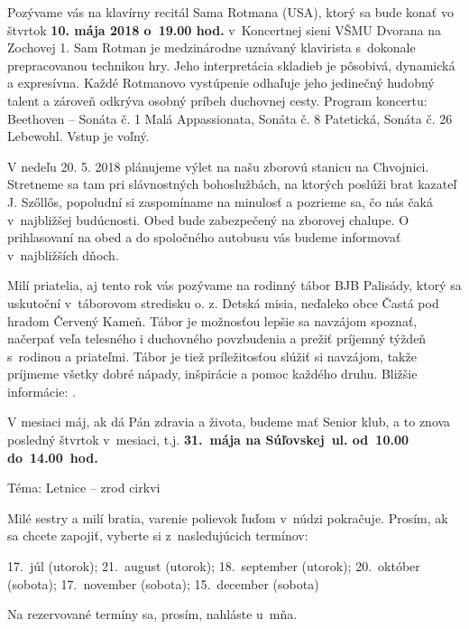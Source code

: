 

Pozývame vás na klavírny recitál Sama Rotmana (USA), ktorý sa bude konať vo štvrtok {\bf 10. mája 2018 o~19.00 hod.} v~Koncertnej sieni VŠMU Dvorana na Zochovej 1. Sam Rotman je medzinárodne uznávaný klavirista s~dokonale prepracovanou technikou hry. Jeho interpretácia skladieb je pôsobivá, dynamická a expresívna. Každé Rotmanovo vystúpenie odhaľuje jeho jedinečný hudobný talent a zároveň odkrýva osobný príbeh duchovnej cesty. Program koncertu: Beethoven – Sonáta č. 1 Malá Appassionata, Sonáta č. 8 Patetická, Sonáta č. 26 Lebewohl. Vstup je voľný.


V nedeľu 20. 5. 2018 plánujeme výlet na našu zborovú stanicu na Chvojnici. Stretneme sa tam pri slávnostných bohoslužbách, na ktorých poslúži brat kazateľ J. Szőllős, popoludní si zaspomíname na minulosť a pozrieme sa, čo nás čaká v~najbližšej budúcnosti. Obed bude zabezpečený na zborovej chalupe. O prihlasovaní na obed a do spoločného autobusu vás budeme informovať v~najbližších dňoch.


Milí priatelia, aj tento rok vás pozývame na rodinný tábor BJB Palisády, ktorý sa uskutoční v~táborovom stredisku o. z. Detská misia, neďaleko obce Častá pod hradom Červený Kameň. Tábor je možnosťou lepšie sa navzájom spoznať, načerpať veľa telesného i duchovného povzbudenia a prežiť príjemný týždeň s~rodinou a priateľmi. Tábor je tiež príležitosťou slúžiť si navzájom, takže príjmeme všetky dobré nápady, inšpirácie a pomoc každého druhu.
Bližšie informácie: .


V mesiaci máj, ak dá Pán zdravia a života, budeme mať Senior klub, a to znova posledný štvrtok v~mesiaci, t.j. {\bf 31.~mája na Súľovskej~ul. od~10.00 do~14.00~hod.}

Téma: Letnice -- zrod cirkvi



Milé sestry a milí bratia, varenie polievok ľuďom v~núdzi pokračuje. Prosím, ak sa chcete zapojiť, vyberte si z~nasledujúcich termínov:

17.~júl (utorok); 21.~august (utorok); 18.~september (utorok); 20.~október (sobota); 17.~november (sobota); 15.~december (sobota)

Na rezervované termíny sa, prosím, nahláste u~mňa.



